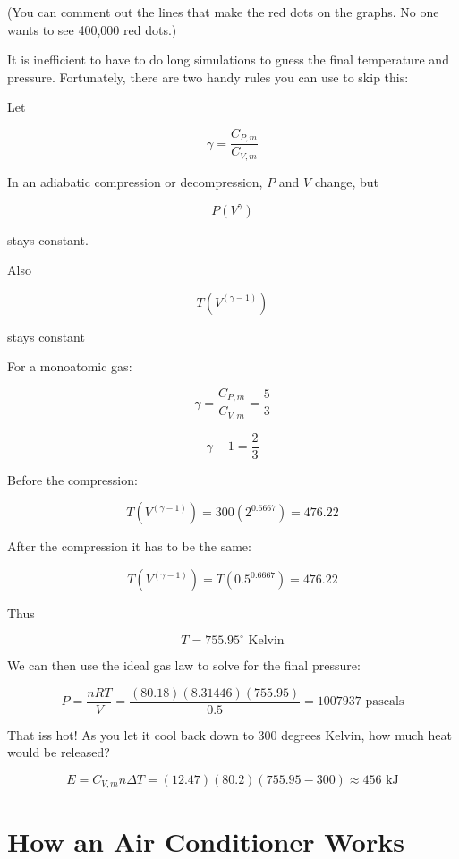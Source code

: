 (You can comment out the lines that make the red dots on the graphs.  No
one wants to see 400,000 red dots.)

It is inefficient to have to do long simulations to guess the final temperature and pressure. Fortunately,  there are two handy rules you can use to skip this:

\begin{mdframed}[style=important, frametitle={Adiabatic Compression and Decompression}]

Let 

$$\gamma = \frac{C_{P,m}}{C_{V,m}}$$

In an adiabatic compression or decompression,  $P$ and $V$ change,  but

$$P \left(V^\gamma \right)$$

stays constant.

Also 

$$T \left(V^{\left( \gamma - 1 \right)} \right)$$

stays constant

\end{mdframed}

For a monoatomic gas:

$$\gamma = \frac{C_{P,m}}{C_{V,m}} = \frac{5}{3}$$

$$\gamma - 1 =  \frac{2}{3}$$

Before the compression: 

$$T \left(V^{\left( \gamma - 1 \right)} \right) = 300 \left( 2^{0.6667} \right) = 476.22$$

After the compression it has to be the same:

$$T \left(V^{\left( \gamma - 1 \right)} \right) = T \left( 0.5^{0.6667} \right) = 476.22$$

Thus 

$$T = 755.95^\circ \text{ Kelvin}$$

We can then use the ideal gas law to solve for the final pressure:

$$P = \frac{n R T}{V}  =  \frac{(80.18)(8.31446)(755.95)}{0.5} = 1007937 \text{ pascals}$$

That iss hot!  As you let it cool back down to 300 degrees Kelvin,  how much heat would be released?  

$$E = C_{V,m} n \Delta T = (12.47)(80.2)(755.95 - 300) \approx  456 \text{ kJ}$$

\section{How an Air Conditioner Works}

